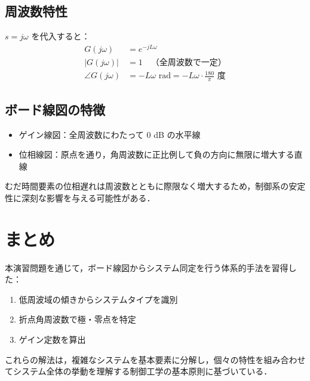 \documentclass[11pt,a4paper]{ltjsarticle} %
\begin{document}
\subsection{周波数特性}
$s = j\omega$ を代入すると：
\begin{align}
G(j\omega) &= e^{-jL\omega} \\
|G(j\omega)| &= 1 \quad \text{（全周波数で一定）} \\
\angle G(j\omega) &= -L\omega \text{ rad} = -L\omega \cdot \frac{180}{\pi} \text{ 度}
\end{align}

\subsection{ボード線図の特徴}
\begin{itemize}
\item ゲイン線図：全周波数にわたって 0 dB の水平線
\item 位相線図：原点を通り，角周波数に正比例して負の方向に無限に増大する直線
\end{itemize}

むだ時間要素の位相遅れは周波数とともに際限なく増大するため，制御系の安定性に深刻な影響を与える可能性がある．

\section{まとめ}
本演習問題を通じて，ボード線図からシステム同定を行う体系的手法を習得した：
\begin{enumerate}
\item 低周波域の傾きからシステムタイプを識別
\item 折点角周波数で極・零点を特定
\item ゲイン定数を算出
\end{enumerate}

これらの解法は，複雑なシステムを基本要素に分解し，個々の特性を組み合わせてシステム全体の挙動を理解する制御工学の基本原則に基づいている．
\end{document}
